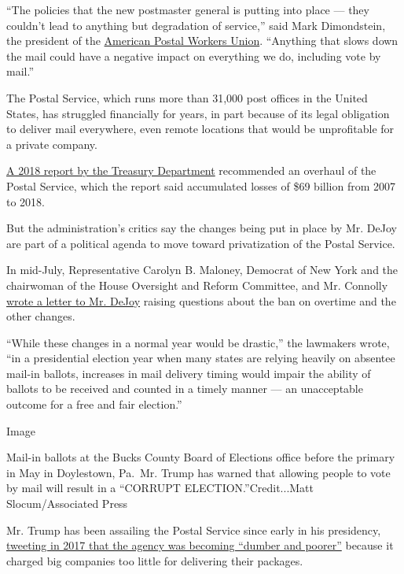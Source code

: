 ``The policies that the new postmaster general is putting into place ---
they couldn't lead to anything but degradation of service,'' said Mark
Dimondstein, the president of the
\href{https://www.apwu.org/mark-dimondstein}{American Postal Workers
Union}. ``Anything that slows down the mail could have a negative impact
on everything we do, including vote by mail.''

The Postal Service, which runs more than 31,000 post offices in the
United States, has struggled financially for years, in part because of
its legal obligation to deliver mail everywhere, even remote locations
that would be unprofitable for a private company.

\href{https://home.treasury.gov/system/files/136/USPS_A_Sustainable_Path_Forward_report_12-04-2018.pdf}{A
2018 report by the Treasury Department} recommended an overhaul of the
Postal Service, which the report said accumulated losses of \$69 billion
from 2007 to 2018.

But the administration's critics say the changes being put in place by
Mr. DeJoy are part of a political agenda to move toward privatization of
the Postal Service.

In mid-July, Representative Carolyn B. Maloney, Democrat of New York and
the chairwoman of the House Oversight and Reform Committee, and Mr.
Connolly
\href{https://oversight.house.gov/sites/democrats.oversight.house.gov/files/2020-07-20.CBM\%20GEC\%20to\%20DeJoy\%20-PMG\%20re\%20Postal\%20Service\%20Changes.pdf}{wrote
a letter to Mr. DeJoy} raising questions about the ban on overtime and
the other changes.

``While these changes in a normal year would be drastic,'' the lawmakers
wrote, ``in a presidential election year when many states are relying
heavily on absentee mail-in ballots, increases in mail delivery timing
would impair the ability of ballots to be received and counted in a
timely manner --- an unacceptable outcome for a free and fair
election.''

Image

Mail-in ballots at the Bucks County Board of Elections office before the
primary in May in Doylestown, Pa.~Mr. Trump has warned that allowing
people to vote by mail will result in a ``CORRUPT
ELECTION.''Credit...Matt Slocum/Associated Press

Mr. Trump has been assailing the Postal Service since early in his
presidency,
\href{https://twitter.com/realDonaldTrump/status/946728546633953285?s=20}{tweeting
in 2017 that the agency was becoming ``dumber and poorer''} because it
charged big companies too little for delivering their packages.

